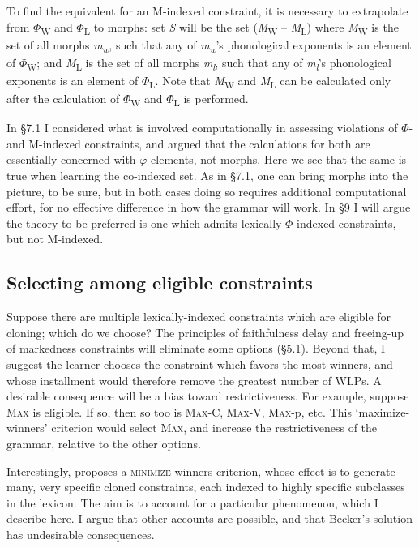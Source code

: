 \documentclass[output=paper,
modfonts
]{LSP/langsci}
\begin{document}
To find the equivalent for an M-indexed constraint, it is necessary to extrapolate from $\Phi $\textsubscript{W} and $\Phi $\textsubscript{L} to morphs: set \textit{S} will be the set (\textit{M}\textsubscript{W} -- \textit{M}\textsubscript{L}) where \textit{M}\textsubscript{W} is the set of all morphs \textit{m}\textit{\textsubscript{w}}, such that any of \textit{m}\textit{\textsubscript{w}}'s phonological exponents is an element of $\Phi $\textsubscript{W}; and \textit{M}\textsubscript{L} is the set of all morphs \textit{m}\textit{\textsubscript{l}}, such that any of \textit{m}\textit{\textsubscript{l}}'s phonological exponents is an element of $\Phi $\textsubscript{L}. Note that \textit{M}\textsubscript{W} and \textit{M}\textsubscript{L} can be calculated only after the calculation of $\Phi $\textsubscript{W} and $\Phi $\textsubscript{L} is performed.

In §7.1 I considered what is involved computationally in assessing violations of $\Phi $- and M-indexed constraints, and argued that the calculations for both are essentially concerned with $\varphi $ elements, not morphs. Here we see that the same is true when learning the co-indexed set. As in §7.1, one can bring morphs into the picture, to be sure, but in both cases doing so requires additional computational effort, for no effective difference in how the grammar will work. In §9 I will argue the theory to be preferred is one which admits lexically $\Phi $-indexed constraints, but not M-indexed.

\subsection[Selecting among eligible constraints]{Selecting among eligible constraints}
\label{bkm:Ref335677590}
Suppose there are multiple lexically-indexed constraints which are eligible for cloning; which do we choose? The principles of faithfulness delay and freeing-up of markedness constraints will eliminate some options (§5.1). Beyond that, I suggest the learner chooses the constraint which favors the most winners, and whose installment would therefore remove the greatest number of WLPs. A desirable consequence will be a bias toward restrictiveness. For example, suppose \textsc{Max} is eligible. If so, then so too is \textsc{Max}{}-C, \textsc{Max}{}-V, \textsc{Max}{}-p, etc. This `maximize-winners' criterion would select \textsc{Max}, and increase the restrictiveness of the grammar, relative to the other options.

Interestingly, \citet{becker2009} proposes a \textsc{minimize}-winners criterion, whose effect is to generate many, very specific cloned constraints, each indexed to highly specific subclasses in the lexicon. The aim is to account for a particular phenomenon, which I describe here. I argue that other accounts are possible, and that Becker's solution has undesirable consequences.
\end{document}
